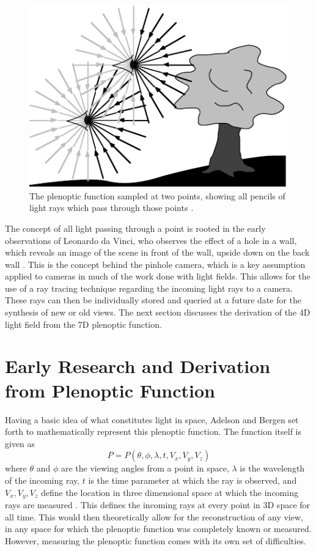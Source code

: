 \documentclass[12pt]{report}
\begin{document}
\begin{figure}[!ht]
	\centering
	\includegraphics[scale=0.75]{plenoptic_image.png}
	\caption{The plenoptic function sampled at two points, showing all pencils of light rays which pass through those points \cite{Adelson91}.}
	\label{fig:plenoptic_visual}
\end{figure}

The concept of all light passing through a point is rooted in the early observations of Leonardo da Vinci, who observes the effect of a hole in a wall, which reveals an image of the scene in front of the wall, upside down on the back wall \cite{Adelson91}. This is the concept behind the pinhole camera, which is a key assumption applied to cameras in much of the work done with light fields. This allows for the use of a ray tracing technique regarding the incoming light rays to a camera. These rays can then be individually stored and queried at a future date for the synthesis of new or old views. The next section discusses the derivation of the 4D light field from the 7D plenoptic function.  

\section{Early Research and Derivation from Plenoptic Function}
Having a basic idea of what constitutes light in space, Adelson and Bergen set forth to mathematically represent this plenoptic function.
The function itself is given as 
\begin{equation}
P=P(\theta,\phi,\lambda,t,V_x, V_y,V_z)
\end{equation}
where $\theta$ and $\phi$ are the viewing angles from a point in space, $\lambda$ is the wavelength of the incoming ray, $t$ is the time parameter at which the ray is observed, and $V_x,V_y,V_z$ define the location in three dimensional space at which the incoming rays are measured \cite{Adelson91}. This defines the incoming rays at every point in 3D space for all time. This would then theoretically allow for the reconstruction of any view, in any space for which the plenoptic function was completely known or measured. However, measuring the plenoptic function comes with its own set of difficulties.
\end{document}
